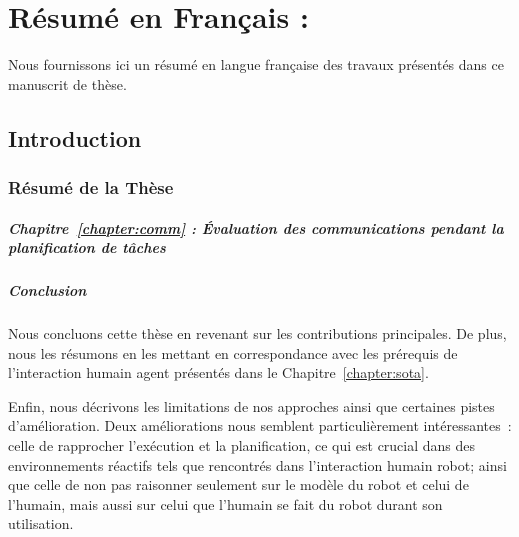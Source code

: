 \chapter{Résumé en Français : }
\label{annex:frenchversion}
Nous fournissons ici un résumé en langue française des travaux présentés dans ce manuscrit de thèse.

\section{Introduction}


\subsection{Résumé de la Thèse}



\paragraph{Chapitre~\ref{chapter:comm} : Évaluation des communications pendant la planification de tâches}



\paragraph{Conclusion}
Nous concluons cette thèse en revenant sur les contributions principales. De plus, nous les résumons en les mettant en correspondance avec les prérequis de l'interaction humain agent présentés dans le Chapitre~\ref{chapter:sota}.

Enfin, nous décrivons les limitations de nos approches ainsi que certaines pistes d'amélioration. Deux améliorations nous semblent particulièrement intéressantes~: celle de rapprocher l’exécution et la planification, ce qui est crucial dans des environnements réactifs tels que rencontrés dans l'interaction humain robot; ainsi que celle de non pas raisonner seulement sur le modèle du robot et celui de l'humain, mais aussi sur celui que l'humain se fait du robot durant son utilisation.




